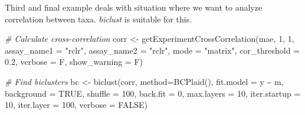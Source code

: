 \documentclass[
]{book}
\newenvironment{Shaded}{\begin{snugshade}}{\end{snugshade}}
\newcommand{\AttributeTok}[1]{\textcolor[rgb]{0.77,0.63,0.00}{#1}}
\newcommand{\CommentTok}[1]{\textcolor[rgb]{0.56,0.35,0.01}{\textit{#1}}}
\newcommand{\ConstantTok}[1]{\textcolor[rgb]{0.00,0.00,0.00}{#1}}
\newcommand{\DecValTok}[1]{\textcolor[rgb]{0.00,0.00,0.81}{#1}}
\newcommand{\FloatTok}[1]{\textcolor[rgb]{0.00,0.00,0.81}{#1}}
\newcommand{\FunctionTok}[1]{\textcolor[rgb]{0.00,0.00,0.00}{#1}}
\newcommand{\NormalTok}[1]{#1}
\newcommand{\OtherTok}[1]{\textcolor[rgb]{0.56,0.35,0.01}{#1}}
\newcommand{\SpecialCharTok}[1]{\textcolor[rgb]{0.00,0.00,0.00}{#1}}
\newcommand{\StringTok}[1]{\textcolor[rgb]{0.31,0.60,0.02}{#1}}
\begin{document}
Third and final example deals with situation where we want to analyze correlation
between taxa. \emph{biclust} is suitable for this.

\begin{Shaded}
\begin{Highlighting}[]
\CommentTok{\# Calculate cross{-}correlation}
\NormalTok{corr }\OtherTok{\textless{}{-}} \FunctionTok{getExperimentCrossCorrelation}\NormalTok{(mae, }\DecValTok{1}\NormalTok{, }\DecValTok{1}\NormalTok{, }
                                      \AttributeTok{assay\_name1 =} \StringTok{"rclr"}\NormalTok{, }\AttributeTok{assay\_name2 =} \StringTok{"rclr"}\NormalTok{, }
                                      \AttributeTok{mode =} \StringTok{"matrix"}\NormalTok{,}
                                      \AttributeTok{cor\_threshold =} \FloatTok{0.2}\NormalTok{, }\AttributeTok{verbose =}\NormalTok{ F, }\AttributeTok{show\_warning =}\NormalTok{ F)}

\CommentTok{\# Find biclusters}
\NormalTok{bc }\OtherTok{\textless{}{-}} \FunctionTok{biclust}\NormalTok{(corr, }\AttributeTok{method=}\FunctionTok{BCPlaid}\NormalTok{(), }\AttributeTok{fit.model =}\NormalTok{ y }\SpecialCharTok{\textasciitilde{}}\NormalTok{ m,}
              \AttributeTok{background =} \ConstantTok{TRUE}\NormalTok{, }\AttributeTok{shuffle =} \DecValTok{100}\NormalTok{, }\AttributeTok{back.fit =} \DecValTok{0}\NormalTok{, }\AttributeTok{max.layers =} \DecValTok{10}\NormalTok{,}
              \AttributeTok{iter.startup =} \DecValTok{10}\NormalTok{, }\AttributeTok{iter.layer =} \DecValTok{100}\NormalTok{, }\AttributeTok{verbose =} \ConstantTok{FALSE}\NormalTok{)}
\end{Highlighting}
\end{Shaded}

\begin{Shaded}
\end{Shaded}
\end{document}
